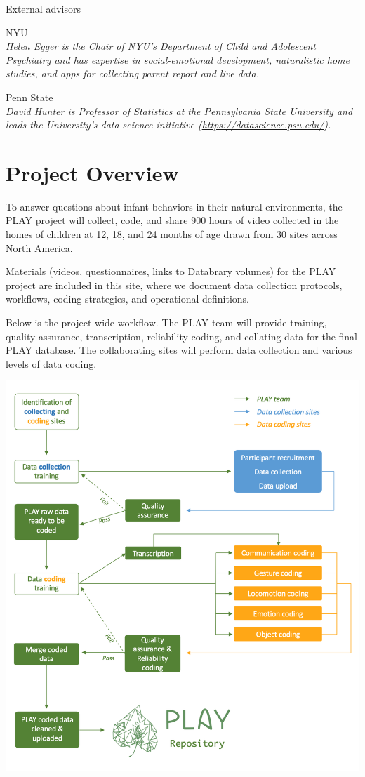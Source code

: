\documentclass[
  12pt,
]{book}
\providecommand{\tightlist}{%
  \setlength{\itemsep}{0pt}\setlength{\parskip}{0pt}}
\begin{document}
External advisors

\begin{description}
\tightlist
\item[Helen Egger]
NYU\\
\emph{Helen Egger is the Chair of NYU's Department of Child and Adolescent Psychiatry and has expertise in social-emotional development, naturalistic home studies, and apps for collecting parent report and live data. }
\item[David Hunter]
Penn State\\
\emph{David Hunter is Professor of Statistics at the Pennsylvania State University and leads the University's data science initiative (\url{https://datascience.psu.edu/}). }
\end{description}

\hypertarget{overview}{%
\chapter{Project Overview}\label{overview}}

To answer questions about infant behaviors in their natural environments, the PLAY project will collect, code, and share 900 hours of video collected in the homes of children at 12, 18, and 24 months of age drawn from 30 sites across North America.

Materials (videos, questionnaires, links to Databrary volumes) for the PLAY project are included in this site, where we document data collection protocols, workflows, coding strategies, and operational definitions.

Below is the project-wide workflow. The PLAY team will provide training, quality assurance, transcription, reliability coding, and collating data for the final PLAY database. The collaborating sites will perform data collection and various levels of data coding.

\begin{center}\includegraphics[width=0.7\linewidth]{img/overview-project} \end{center}
\end{document}
